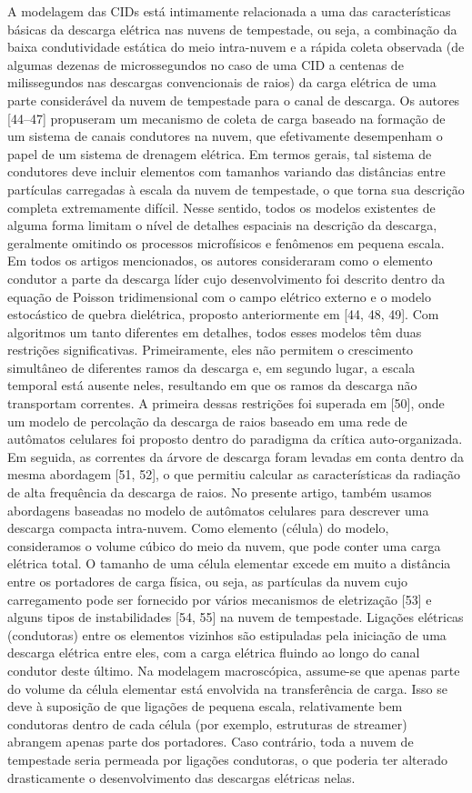 \documentclass[a4paper, 12pt, onecolumn,singlespacing]{article}
\begin{document}
	A modelagem das CIDs está intimamente relacionada a uma das características básicas da descarga elétrica nas nuvens de tempestade, ou seja, a combinação da baixa condutividade estática do meio intra-nuvem e a rápida coleta observada (de algumas dezenas de microssegundos no caso de uma CID a centenas de milissegundos nas descargas convencionais de raios) da carga elétrica de uma parte considerável da nuvem de tempestade para o canal de descarga. Os autores [44–47] propuseram um mecanismo de coleta de carga baseado na formação de um sistema de canais condutores na nuvem, que efetivamente desempenham o papel de um sistema de drenagem elétrica. Em termos gerais, tal sistema de condutores deve incluir elementos com tamanhos variando das distâncias entre partículas carregadas à escala da nuvem de tempestade, o que torna sua descrição completa extremamente difícil. Nesse sentido, todos os modelos existentes de alguma forma limitam o nível de detalhes espaciais na descrição da descarga, geralmente omitindo os processos microfísicos e fenômenos em pequena escala. Em todos os artigos mencionados, os autores consideraram como o elemento condutor a parte da descarga líder cujo desenvolvimento foi descrito dentro da equação de Poisson tridimensional com o campo elétrico externo e o modelo estocástico de quebra dielétrica, proposto anteriormente em [44, 48, 49]. Com algoritmos um tanto diferentes em detalhes, todos esses modelos têm duas restrições significativas. Primeiramente, eles não permitem o crescimento simultâneo de diferentes ramos da descarga e, em segundo lugar, a escala temporal está ausente neles, resultando em que os ramos da descarga não transportam correntes. A primeira dessas restrições foi superada em [50], onde um modelo de percolação da descarga de raios baseado em uma rede de autômatos celulares foi proposto dentro do paradigma da crítica auto-organizada. Em seguida, as correntes da árvore de descarga foram levadas em conta dentro da mesma abordagem [51, 52], o que permitiu calcular as características da radiação de alta frequência da descarga de raios. No presente artigo, também usamos abordagens baseadas no modelo de autômatos celulares para descrever uma descarga compacta intra-nuvem. Como elemento (célula) do modelo, consideramos o volume cúbico do meio da nuvem, que pode conter uma carga elétrica total. O tamanho de uma célula elementar excede em muito a distância entre os portadores de carga física, ou seja, as partículas da nuvem cujo carregamento pode ser fornecido por vários mecanismos de eletrização [53] e alguns tipos de instabilidades [54, 55] na nuvem de tempestade. Ligações elétricas (condutoras) entre os elementos vizinhos são estipuladas pela iniciação de uma descarga elétrica entre eles, com a carga elétrica fluindo ao longo do canal condutor deste último. Na modelagem macroscópica, assume-se que apenas parte do volume da célula elementar está envolvida na transferência de carga. Isso se deve à suposição de que ligações de pequena escala, relativamente bem condutoras dentro de cada célula (por exemplo, estruturas de streamer) abrangem apenas parte dos portadores. Caso contrário, toda a nuvem de tempestade seria permeada por ligações condutoras, o que poderia ter alterado drasticamente o desenvolvimento das descargas elétricas nelas.
	
\end{document}
